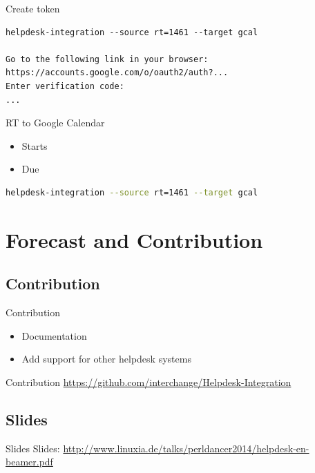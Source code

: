 \begin{frame}[fragile]{Create token}
\begin{lstlisting}
helpdesk-integration --source rt=1461 --target gcal

Go to the following link in your browser:
https://accounts.google.com/o/oauth2/auth?...
Enter verification code:
...
\end{lstlisting}
\end{frame}

\begin{frame}[fragile]{RT to Google Calendar}
\begin{itemize}
\item Starts
\item Due
\end{itemize}

\begin{lstlisting}[language=bash]
helpdesk-integration --source rt=1461 --target gcal
\end{lstlisting}
\end{frame}

\section{Forecast and Contribution}

\subsection{Contribution}
\begin{frame}{Contribution}
\begin{itemize}
\item Documentation
\item Add support for other helpdesk systems
\end{itemize}
\end{frame}

\begin{frame}{Contribution}
\url{https://github.com/interchange/Helpdesk-Integration}
\end{frame}

\subsection{Slides}

\begin{frame}{Slides}
Slides:
\url{http://www.linuxia.de/talks/perldancer2014/helpdesk-en-beamer.pdf}
\end{frame}



